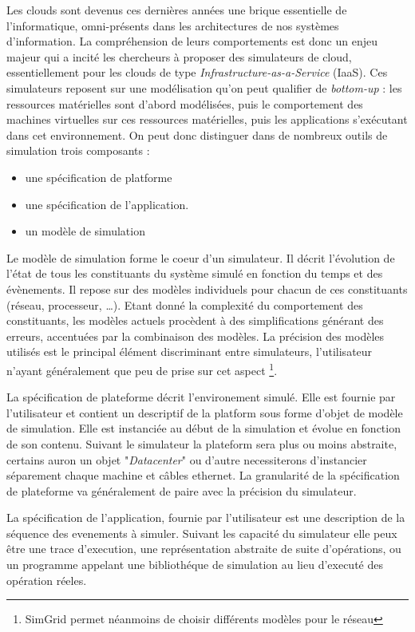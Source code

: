 \documentclass[parallelisme]{compas2017}
\begin{document}
Les  clouds  sont  devenus  ces  dernières  années  une  brique  essentielle  de
l'informatique,   omni-présents  dans   les   architectures   de  nos   systèmes
d'information. La compréhension de leurs  comportements est donc un enjeu majeur
qui a incité les chercheurs à proposer des simulateurs de cloud, essentiellement
pour les clouds de type \textit{Infrastructure-as-a-Service} (IaaS). Ces
simulateurs   reposent   sur   une   modélisation  qu'on   peut   qualifier   de
\textit{bottom-up} : les ressources matérielles sont d'abord modélisées, puis le
comportement des  machines virtuelles sur  ces ressources matérielles,  puis les
applications s'exécutant dans cet environnement. On peut donc distinguer dans 
de nombreux outils de simulation trois composants : 
\begin{itemize}
		\item une spécification de platforme
		\item une spécification de l'application.
		\item un modèle de simulation
\end{itemize}

Le modèle de simulation forme le coeur d'un simulateur. Il décrit l'évolution de
l'état de tous  les constituants du système  simulé en fonction du  temps et des
évènements.   Il  repose  sur  des   modèles  individuels  pour  chacun  de  ces
constituants  (réseau,   processeur,  \ldots).    Etant  donné  la   complexité  du
comportement   des   constituants,  les   modèles   actuels   procèdent  à   des
simplifications  générant  des  erreurs,   accentuées  par  la  combinaison  des
modèles. La précision des modèles utilisés est le principal élément discriminant
entre simulateurs, l'utilisateur  n'ayant généralement que peu de  prise sur cet
aspect%
\footnote{SimGrid  permet  néanmoins de  choisir  différents  modèles pour le réseau}.

La spécification de plateforme décrit l'environement simulé. Elle est fournie
par l'utilisateur et contient un descriptif de la platform sous forme d'objet de
modèle de simulation. Elle est instanciée au début de la simulation et évolue en
fonction de son contenu. Suivant le simulateur la plateform sera plus ou moins
abstraite, certains auron un objet "\emph{Datacenter}" ou d'autre necessiterons
d'instancier séparement chaque machine et câbles ethernet. La granularité de la
spécification de plateforme va généralement de paire avec la précision du
simulateur.

La spécification de l'application, fournie par l'utilisateur est une description
de la séquence des evenements à simuler. Suivant les capacité du simulateur elle
peux être une trace d'execution, une représentation abstraite de suite
d'opérations, ou un programme appelant une bibliothéque de simulation au lieu
d'executé des opération réeles.
\end{document}
